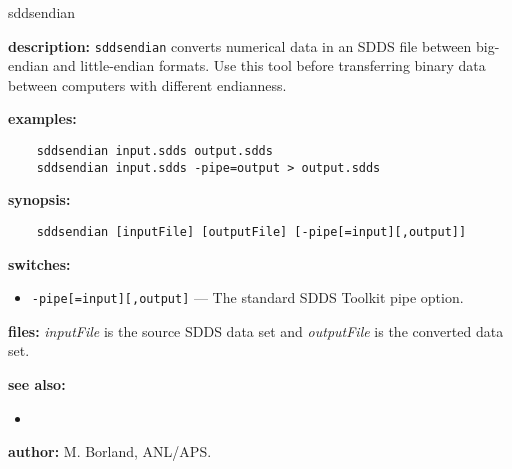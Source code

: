 \begin{sddsprog}{sddsendian}
  \item \textbf{description:} \verb|sddsendian| converts numerical data in an SDDS file between big-endian and little-endian formats. Use this tool before transferring binary data between computers with different endianness.
  \item \textbf{examples:}
    \begin{verbatim}
    sddsendian input.sdds output.sdds
    sddsendian input.sdds -pipe=output > output.sdds
    \end{verbatim}
  \item \textbf{synopsis:}
    \begin{verbatim}
    sddsendian [inputFile] [outputFile] [-pipe[=input][,output]]
    \end{verbatim}
  \item \textbf{switches:}
    \begin{itemize}
      \item \verb|-pipe[=input][,output]| --- The standard SDDS Toolkit pipe option.
    \end{itemize}
  \item \textbf{files:} \emph{inputFile} is the source SDDS data set and \emph{outputFile} is the converted data set.
  \item \textbf{see also:}
    \begin{itemize}
      \item {}
    \end{itemize}
  \item \textbf{author:} M. Borland, ANL/APS.
\end{sddsprog}

